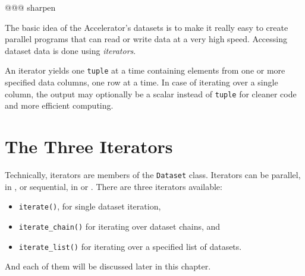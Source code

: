 
\label{chap:iterators}

@@@ sharpen

The basic idea of the Accelerator's datasets is to make it really easy
to create parallel programs that can read or write data at a very high
speed.  Accessing dataset data is done using \textsl{iterators}.

An iterator yields one \texttt{tuple} at a time containing elements
from one or more specified data columns, one row at a time.  In case
of iterating over a single column, the output may optionally be a
scalar instead of \texttt{tuple} for cleaner code and more efficient
computing.





\section{The Three Iterators}
Technically, iterators are members of the \texttt{Dataset} class.
Iterators can be parallel, in \analysis, or sequential, in \prepare
or \synthesis.  There are three iterators available:
\begin{itemize}
\item [] \texttt{iterate()}, for single dataset iteration,
\item [] \texttt{iterate\_chain()} for iterating over dataset chains, and
\item [] \texttt{iterate\_list()} for iterating over a specified list of datasets.
\end{itemize}
And each of them will be discussed later in this chapter.

